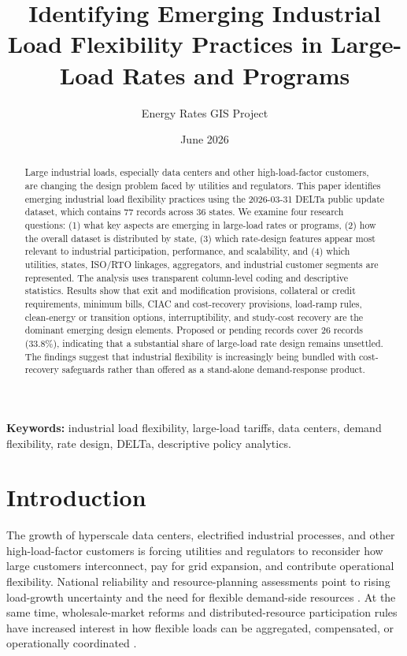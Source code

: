 \documentclass[11pt]{article}
\title{Identifying Emerging Industrial Load Flexibility Practices in Large-Load Rates and Programs}
\author{Energy Rates GIS Project}
\date{June 2026}
\begin{document}
\maketitle

\begin{abstract}
Large industrial loads, especially data centers and other high-load-factor customers, are changing the design problem faced by utilities and regulators. This paper identifies emerging industrial load flexibility practices using the 2026-03-31 DELTa public update dataset, which contains 77 records across 36 states. We examine four research questions: (1) what key aspects are emerging in large-load rates or programs, (2) how the overall dataset is distributed by state, (3) which rate-design features appear most relevant to industrial participation, performance, and scalability, and (4) which utilities, states, ISO/RTO linkages, aggregators, and industrial customer segments are represented. The analysis uses transparent column-level coding and descriptive statistics. Results show that exit and modification provisions, collateral or credit requirements, minimum bills, CIAC and cost-recovery provisions, load-ramp rules, clean-energy or transition options, interruptibility, and study-cost recovery are the dominant emerging design elements. Proposed or pending records cover 26 records (33.8\%), indicating that a substantial share of large-load rate design remains unsettled. The findings suggest that industrial flexibility is increasingly being bundled with cost-recovery safeguards rather than offered as a stand-alone demand-response product.
\end{abstract}

\noindent\textbf{Keywords:} industrial load flexibility, large-load tariffs, data centers, demand flexibility, rate design, DELTa, descriptive policy analytics.

\section{Introduction}
The growth of hyperscale data centers, electrified industrial processes, and other high-load-factor customers is forcing utilities and regulators to reconsider how large customers interconnect, pay for grid expansion, and contribute operational flexibility. National reliability and resource-planning assessments point to rising load-growth uncertainty and the need for flexible demand-side resources \cite{ml14,ml15,ml17}. At the same time, wholesale-market reforms and distributed-resource participation rules have increased interest in how flexible loads can be aggregated, compensated, or operationally coordinated \cite{ml16}.
\end{document}
